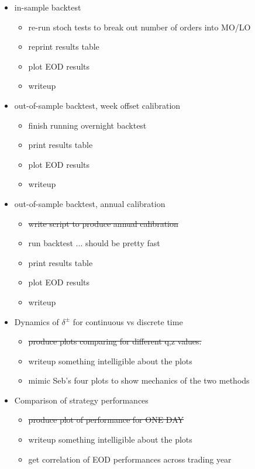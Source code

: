 \documentclass[12pt]{article}
\begin{document}
\clearpage 

\begin{itemize}[topsep=0pt,itemsep=0ex,partopsep=0ex,parsep=0ex]
\item in-sample backtest
\begin{itemize}[topsep=0pt,itemsep=0ex,partopsep=0ex,parsep=0ex]
\item re-run stoch tests to break out number of orders into MO/LO
\item reprint results table
\item plot EOD results
\item writeup
\end{itemize}

\item out-of-sample backtest, week offset calibration
\begin{itemize}[topsep=0pt,itemsep=0ex,partopsep=0ex,parsep=0ex]
\item finish running overnight backtest
\item print results table
\item plot EOD results
\item writeup
\end{itemize}

\item out-of-sample backtest, annual calibration
\begin{itemize}[topsep=0pt,itemsep=0ex,partopsep=0ex,parsep=0ex]
\item \st{write script to produce annual calibration}
\item run backtest ... should be pretty fast
\item print results table
\item plot EOD results
\item writeup
\end{itemize}

\item Dynamics of $\delta^\pm$ for continuous vs discrete time
\begin{itemize}[topsep=0pt,itemsep=0ex,partopsep=0ex,parsep=0ex]
\item \st{produce plots comparing for different q,z values.}
\item writeup something intelligible about the plots
\item mimic Seb's four plots to show mechanics of the two methods
\end{itemize}

\item Comparison of strategy performances
\begin{itemize}[topsep=0pt,itemsep=0ex,partopsep=0ex,parsep=0ex]
\item \st{produce plot of performance for ONE DAY}
\item writeup something intelligible about the plots
\item get correlation of EOD performances across trading year
\end{itemize}


\end{itemize}
\end{document}
